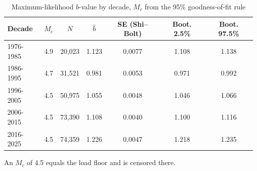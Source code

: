 \begin{table}[t]
\centering
\begin{threeparttable}
\caption{Maximum-likelihood $b$-value by decade, $M_c$ from the 95\% goodness-of-fit rule}
\label{tab:bvalues_gft95}
\begin{tabular}{lcccccc}
\toprule
Decade & $M_c$ & $N$ & $\hat b$ & SE (Shi--Bolt) & Boot. 2.5\% & Boot. 97.5\% \\
\midrule
1976-1985 & 4.9 & 20,023 & 1.123 & 0.0077 & 1.108 & 1.138 \\
1986-1995 & 4.7 & 31,521 & 0.981 & 0.0053 & 0.971 & 0.992 \\
1996-2005 & 4.5 & 50,975 & 1.055 & 0.0048 & 1.046 & 1.066 \\
2006-2015 & 4.5 & 73,390 & 1.108 & 0.0040 & 1.100 & 1.116 \\
2016-2025 & 4.5 & 74,359 & 1.226 & 0.0047 & 1.218 & 1.235 \\
\bottomrule
\end{tabular}
\begin{tablenotes}[flushleft]
\footnotesize
\item An $M_c$ of 4.5 equals the load floor and is censored there.
\end{tablenotes}
\end{threeparttable}
\end{table}
